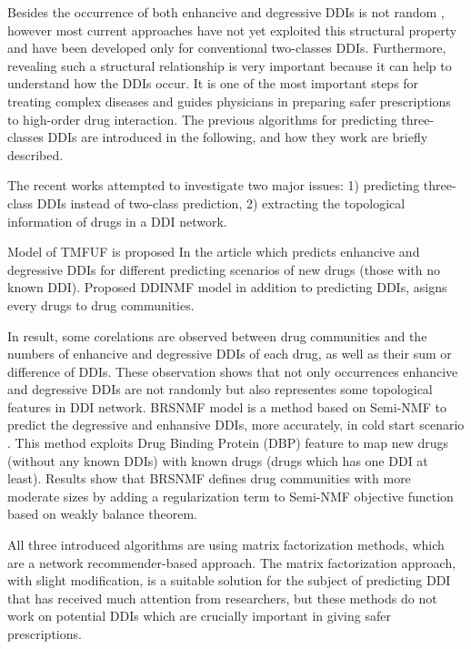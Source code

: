 \documentclass{bmcart}
\begin{document}
Besides the occurrence of both enhancive and degressive DDIs is not random \cite{shi2018tmfuf, yu2018predicting}, however most current approaches have not yet exploited this structural property and have been developed only for conventional two-classes DDIs. Furthermore, revealing such a structural relationship is very important because it can help to understand how the DDIs occur. It is one of the most important steps for treating complex diseases \cite{cokol2017efficient} and guides physicians in preparing safer prescriptions to high-order drug interaction. The previous algorithms for predicting three-classes DDIs are introduced in the following, and how they work are briefly described. 

The recent works attempted to investigate two major issues: 1) predicting three-class DDIs instead of two-class prediction, 2) extracting the topological information of drugs in a DDI network.

Model of TMFUF is proposed In the article \cite{shi2018tmfuf} which predicts enhancive and degressive DDIs for different predicting scenarios of new drugs (those with no known DDI). Proposed DDINMF model \cite{yu2018predicting} in addition to predicting DDIs, asigns every drugs to drug communities.

In result, some corelations are observed between drug communities and the numbers of enhancive and degressive DDIs of each drug, as well as their sum or difference of DDIs. These observation shows that not only occurrences enhancive and degressive DDIs are not randomly but also representes some topological features in DDI network. BRSNMF \cite{shi2019detecting} model is a method based on Semi-NMF to predict the degressive and enhansive DDIs, more accurately, in cold start scenario \cite{camacho2018social}. This method exploits Drug Binding Protein (DBP) feature to map new drugs (without any known DDIs) with known drugs (drugs which has one DDI at least). Results show that BRSNMF defines drug communities with more moderate sizes by adding a regularization term to Semi-NMF objective function based on weakly balance theorem.

All three introduced algorithms are using matrix factorization methods, which are a network recommender-based approach. The matrix factorization approach, with slight modification, is a suitable solution for the subject of predicting DDI that has received much attention from researchers, but these methods do not work on potential DDIs which are crucially important in giving safer prescriptions.
\end{document}
